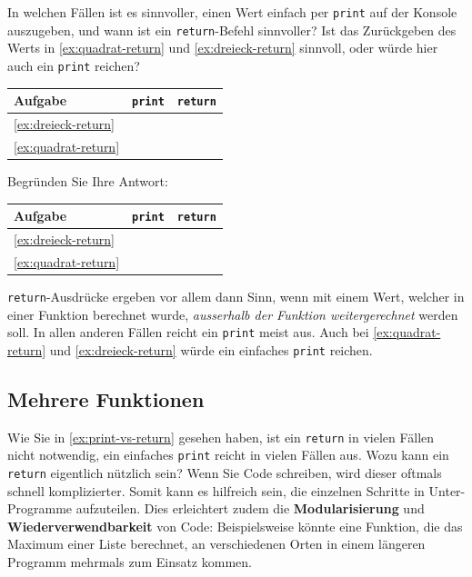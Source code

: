 \begin{myexercise}\label{ex:print-vs-return}
	In welchen Fällen ist es sinnvoller, einen Wert einfach per \lstinline|print| auf der Konsole auszugeben, und wann ist ein \lstinline|return|-Befehl sinnvoller? Ist das Zurückgeben des Werts in \cref{ex:quadrat-return} und \cref{ex:dreieck-return} sinnvoll, oder würde hier auch ein \lstinline|print| reichen?

	\begin{center}
		\begin{tabular}{l|c|c}
			\textbf{Aufgabe}         & \lstinline|print| & \lstinline|return| \\
			\midrule\midrule
			\cref{ex:dreieck-return} &                   &                    \\
			\midrule
			\cref{ex:quadrat-return} &                   &                    \\
		\end{tabular}
	\end{center}

	Begründen Sie Ihre Antwort:
	\begin{myanswer}
		\begin{center}
			\begin{tabular}{l|c|c}
				\textbf{Aufgabe}         & \lstinline|print| & \lstinline|return| \\
				\midrule\midrule
				\cref{ex:dreieck-return} & \faCheckSquare    &                    \\
				\midrule
				\cref{ex:quadrat-return} & \faCheckSquare    &                    \\
			\end{tabular}
		\end{center}
		\lstinline|return|-Ausdrücke ergeben vor allem dann Sinn, wenn mit einem Wert, welcher in einer Funktion berechnet wurde, \textit{ausserhalb der Funktion weitergerechnet} werden soll. In allen anderen Fällen reicht ein \lstinline|print| meist aus. Auch bei \cref{ex:quadrat-return} und \cref{ex:dreieck-return} würde ein einfaches \lstinline|print| reichen.
	\end{myanswer}
\end{myexercise}

\subsection{Mehrere Funktionen}
Wie Sie in \cref{ex:print-vs-return} gesehen haben, ist ein \lstinline|return| in vielen Fällen nicht notwendig, ein einfaches \lstinline|print| reicht in vielen Fällen aus. Wozu kann ein \lstinline|return| eigentlich nützlich sein? Wenn Sie Code schreiben, wird dieser oftmals schnell komplizierter. Somit kann es hilfreich sein, die einzelnen Schritte in Unter-Programme aufzuteilen. Dies erleichtert zudem die \textbf{Modularisierung} und \textbf{Wiederverwendbarkeit} von Code: Beispielsweise könnte eine Funktion, die das Maximum einer Liste berechnet, an verschiedenen Orten in einem längeren Programm mehrmals zum Einsatz kommen.

